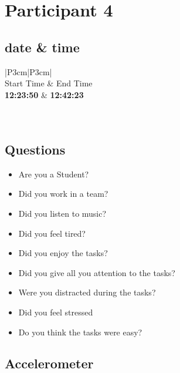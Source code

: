 \section{Participant 4}

\subsection{date \& time}
\begin{table}[ht]
  \begin{tabular}{|P{3cm}|P{3cm}|}
	    	\\ \hline
    Start Time      			& End Time   					\\ \hline
   \textbf{12:23:50} 	& \textbf{12:42:23}    	\\ \hline
       						\\ \hline
    			\\ \hline
  \end{tabular}
  \newline\newline
  \caption{date and time}\label{dandt1}
\end{table}

\subsection{Questions}
\begin{itemize} 
  \item[\XSolidBrush] Are you a Student?
  \item[\Checkmark] Did you work in a team?
  \item[\Checkmark] Did you listen to music?
  \item[\XSolidBrush] Did you feel tired?
  \item[\Checkmark] Did you enjoy the tasks?
  \item[\Checkmark] Did you give all you attention to the tasks?
  \item[\XSolidBrush] Were you distracted during the tasks?
  \item[\XSolidBrush] Did you feel stressed
  \item[\Checkmark] Do you think the tasks were easy?  
\end{itemize}


\FloatBarrier
\newpage
\subsection{Accelerometer}


